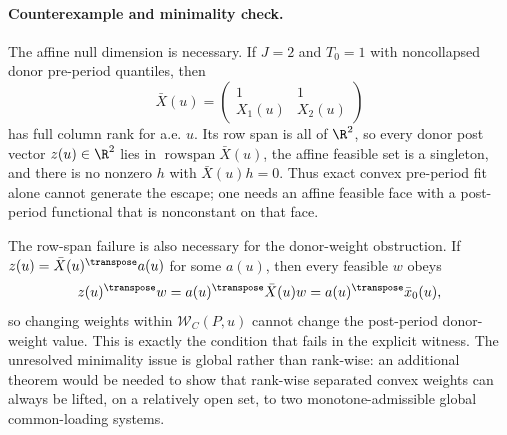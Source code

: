 \paragraph{Counterexample and minimality check.}
The affine null dimension is necessary.  If \(J=2\) and \(T_0=1\) with noncollapsed donor pre-period quantiles, then
\[
\bar X(u)=\begin{pmatrix}1&1\\ X_1(u)&X_2(u)\end{pmatrix}
\]
has full column rank for a.e. \(u\).  Its row span is all of \(\R^2\), so every donor post vector \(z(u)\in\R^2\) lies in \(\operatorname{rowspan}\bar X(u)\), the affine feasible set is a singleton, and there is no nonzero \(h\) with \(\bar X(u)h=0\).  Thus exact convex pre-period fit alone cannot generate the escape; one needs an affine feasible face with a post-period functional that is nonconstant on that face.

The row-span failure is also necessary for the donor-weight obstruction.  If \(z(u)=\bar X(u)^\transpose a(u)\) for some \(a(u)\), then every feasible \(w\) obeys
\[
z(u)^\transpose w=a(u)^\transpose\bar X(u)w=a(u)^\transpose\bar x_0(u),
\]
so changing weights within \(\mathcal{W}_C(P,u)\) cannot change the post-period donor-weight value.  This is exactly the condition that fails in the explicit witness.  The unresolved minimality issue is global rather than rank-wise: an additional theorem would be needed to show that rank-wise separated convex weights can always be lifted, on a relatively open set, to two monotone-admissible global common-loading systems.
